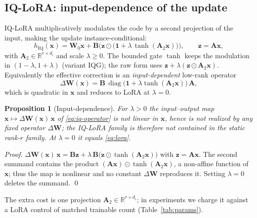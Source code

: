 \documentclass[preprint,11pt]{elsarticle}
\newcommand{\R}{\mathbb{R}}
\newcommand{\x}{\bm{x}}
\newcommand{\z}{\bm{z}}
\newcommand{\W}{\bm{W}}
\newcommand{\A}{\bm{A}}
\newcommand{\B}{\bm{B}}
\DeclareMathOperator{\diag}{diag}
\newtheorem{proposition}{Proposition}
\begin{document}
\subsection{IQ-LoRA: input-dependence of the update}
IQ-LoRA multiplicatively modulates the code by a second projection of the input, making the update instance-conditional:
\begin{equation}
h_{\text{IQ}}(\x)=\W_0\x+\B\Big(\z\odot\big(\bm{1}+\lambda\,\tanh(\A_2\x)\big)\Big),\qquad \z=\A\x,
\label{eq:iq}
\end{equation}
with $\A_2\in\R^{r\times d_i}$ and scale $\lambda\ge0$. The bounded gate $\tanh$ keeps the modulation in $(1\!-\!\lambda,
1\!+\!\lambda)$ (variant IQG); the raw form uses $\z+\lambda(\z\odot\A_2\x)$. Equivalently the effective correction is an
\emph{input-dependent} low-rank operator
\begin{equation}
\Delta\W(\x)=\B\,\diag\!\big(\bm{1}+\lambda\tanh(\A_2\x)\big)\,\A,
\label{eq:iq-operator}
\end{equation}
which is quadratic in $\x$ and reduces to LoRA at $\lambda=0$.
\begin{proposition}[Input-dependence]
\label{prop:iq}
For $\lambda>0$ the input--output map $\x\mapsto\Delta\W(\x)\,\x$ of \eqref{eq:iq-operator} is not linear in $\x$, hence
is not realized by any fixed operator $\Delta\W$; the IQ-LoRA family is therefore not contained in the static rank-$r$
family. At $\lambda=0$ it equals \eqref{eq:lora}.
\end{proposition}
\begin{proof}
$\Delta\W(\x)\,\x=\B\z+\lambda\,\B\big(\z\odot\tanh(\A_2\x)\big)$ with $\z=\A\x$. The second summand contains the product
$(\A\x)\odot\tanh(\A_2\x)$, a non-affine function of $\x$; thus the map is nonlinear and no constant $\Delta\W$ reproduces
it. Setting $\lambda=0$ deletes the summand. \qed
\end{proof}
The extra cost is one projection $\A_2\in\R^{r\times d_i}$; in experiments we charge it against a LoRA control of matched
trainable count (Table~\ref{tab:params}).
\end{document}
